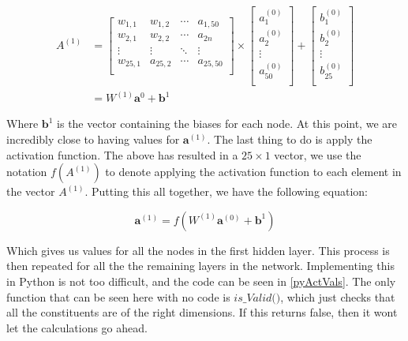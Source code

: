 \begin{align}
    A^{(1)} &= \left[ {\begin{array}{cccc}
        w_{1,1} & w_{1,2} & \cdots & a_{1,50}\\
        w_{2,1} & w_{2,2} & \cdots & a_{2n}\\
        \vdots & \vdots & \ddots & \vdots\\
        w_{25,1} & a_{25,2} & \cdots & a_{25,50}\\
      \end{array} } \right] \times \left[ \begin{array}{c}
          a^{(0)}_1 \\
          a^{(0)}_2 \\
          \vdots \\
          a^{(0)}_{50} \\
      \end{array} \right] + \left[ \begin{array}{c}
        b^{(0)}_1 \\
        b^{(0)}_2 \\
        \vdots \\
        b^{(0)}_{25} \\
        \end{array} \right] \\
      &= W^{(1)}\textbf{a}^{0} + \textbf{b}^1
\end{align}

Where $\textbf{b}^1$ is the vector containing the biases for each node.  At this point, we are incredibly close to having values for $\textbf{a}^{(1)}$. The last thing to do
is apply the activation function. The above has resulted in a $25\times 1$ vector, we use the notation $f(A^{(1)})$ to denote applying the activation function to each 
element in the vector $A^{(1)}$. Putting this all together, we have the following equation:

\begin{equation}
    \textbf{a}^{(1)} = f(W^{(1)}\textbf{a}^{(0)} + \textbf{b}^{1})
\end{equation}

Which gives us values for all the nodes in the first hidden layer. This process is then repeated for all the the remaining layers in the network. Implementing this in Python 
is not too difficult, and the code can be seen in \ref{pyActVals}. The only function that can be seen here with no code is $\textit{is\_Valid()}$, which just checks that all the 
constituents are of the right dimensions. If this returns false, then it wont let the calculations go ahead. 

